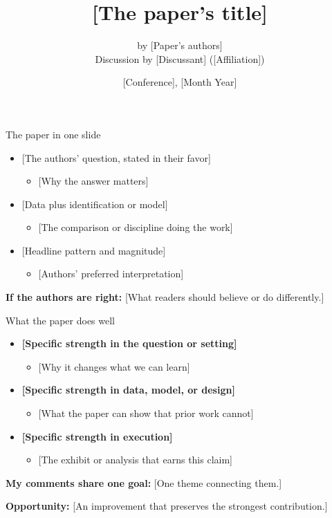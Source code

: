 \documentclass[11pt, aspectratio=169]{beamer}
\title[Paper title]{[The paper's title]}
\author[Discussant surname]{by [Paper's authors]\\[1.0em]
        Discussion by [Discussant] ([Affiliation])}
\date[Conference]{[Conference], [Month Year]}
\begin{document}
\begin{frame}[plain]
  \titlepage
\end{frame}
\addtocounter{framenumber}{-1}

\begin{frame}{The paper in one slide}
  \begin{itemize}\setlength{\itemsep}{0.7em}
    \item[]  [The authors' question, stated in their favor]
      \begin{itemize}\item {[Why the answer matters]}\end{itemize}
    \item[]  [Data plus identification or model]
      \begin{itemize}\item {[The comparison or discipline doing the work]}\end{itemize}
    \item[]  [Headline pattern and magnitude]  %
      \begin{itemize}\item {[Authors' preferred interpretation]}\end{itemize}
  \end{itemize}
  \bigskip
  \textbf{If the authors are right:} [What readers should believe or do differently.]
\end{frame}

\begin{frame}{What the paper does well}
  \begin{itemize}\setlength{\itemsep}{0.7em}
    \item \textbf{[Specific strength in the question or setting]}
      \begin{itemize}\item {[Why it changes what we can learn]}\end{itemize}
    \item \textbf{[Specific strength in data, model, or design]}
      \begin{itemize}\item {[What the paper can show that prior work cannot]}\end{itemize}
    \item \textbf{[Specific strength in execution]}
      \begin{itemize}\item {[The exhibit or analysis that earns this claim]}\end{itemize}
  \end{itemize}
  \bigskip
  \textbf{My comments share one goal:} [One theme connecting them.]
  \par\medskip
  \textbf{Opportunity:} [An improvement that preserves the strongest contribution.]
\end{frame}
\end{document}
